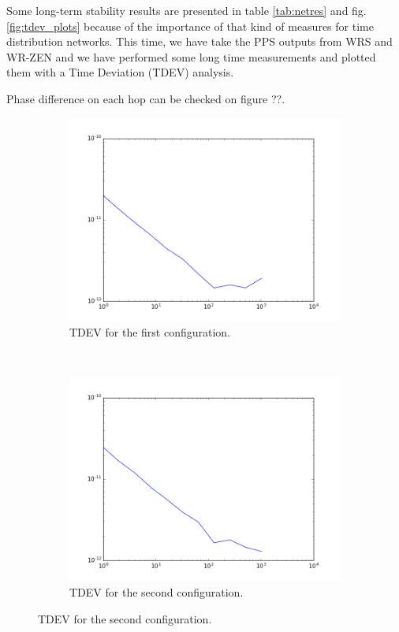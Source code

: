 Some long-term stability results are presented in table \ref{tab:netres} and fig. \ref{fig:tdev_plots} because of the importance of that kind of measures for time distribution networks. This time, we have take the PPS outputs from WRS and WR-ZEN and we have performed some long time measurements and plotted them with a Time Deviation (TDEV) analysis. 

Phase difference on each hop can be checked on figure ??.

\begin{figure}[H]
    \begin{subfigure}[t]{.45\textwidth}
        \centering
        \includegraphics[width=\textwidth]{img/pps_p1.png}
        \caption{TDEV for the first configuration.}
        \label{fig:pps_p1}
    \end{subfigure}
    ~
    \begin{subfigure}[t]{.45\textwidth}
        \centering
        \includegraphics[width=\textwidth]{img/pps_p2.png}
        \caption{TDEV for the second configuration.}
        \label{fig:pps_p2}
    \end{subfigure}
    

\end{figure}
